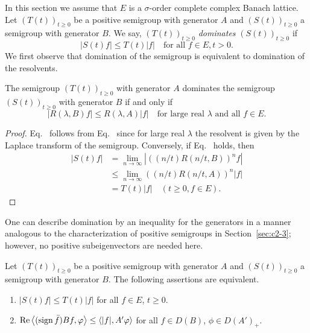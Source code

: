 In this section we assume that $E$ is a $\sigma$-order complete complex Banach lattice. 
Let $(T(t))_{t \geq 0}$ be a positive semigroup with generator $A$ and $(S(t))_{t \geq 0}$ a semigroup with generator $B$. 
We say, $(T(t))_{t \geq 0}$ \emph{dominates} $(S(t))_{t \geq 0}$ if
\begin{equation}\label{eq:c2-4.1}
|S(t)f| \leq T(t)|f| \quad \text{for all } f \in E, t > 0.
\end{equation}
We first observe that domination of the semigroup is equivalent to domination of the resolvents.
\begin{proposition}\label{prop:c2-4.1}
The semigroup $(T(t))_{t \geq 0}$ with generator $A$ dominates the semigroup $(S(t))_{t \geq 0}$ with generator $B$ if and only if
\begin{equation}\label{eq:c2-4.2}
|R(\lambda,B)f| \leq R(\lambda,A)|f| %
\quad \text{for large real }  \lambda  \text{ and all } f \in E .
\end{equation}
\end{proposition}
\begin{proof}
Eq.~ follows from Eq.~ since for large real $\lambda$ the resolvent is given by the Laplace transform of the semigroup. 
Conversely, if Eq.~ holds, then
\begin{align*}
|S(t)f| &= \lim_{n \to \infty} |((n/t)R(n/t,B))^{n}f|\\
&\leq \lim_{n \to \infty} ((n/t)R(n/t,A))^{n}|f|\\
&= T(t)|f| \quad (t \geq 0, f \in E).
\tag*{\qedsymbol}%
\end{align*}
\let\qedsymbol\relax
\end{proof}
One can describe domination by an inequality for the generators in a manner analogous to the characterization of positive semigroups in Section~\ref{sec:c2-3}; however, no positive subeigenvectors are needed here.
\begin{theorem}\label{thm:c2-4.2}
Let $(T(t))_{t \geq 0}$ be a positive semigroup with generator $A$ and $(S(t))_{t \geq 0}$ a semigroup with generator $B$. The following assertions are equivalent.
\begin{enumerate}[\upshape (a)]
\item \label{thm:c2-4.2-1}
$|S(t)f| \leq T(t)|f|$ for all $f \in E$, $t \geq 0$.
\item \label{thm:c2-4.2-2}
$\Re\left\langle(\sign  \bar{f}) Bf,\phi\right\rangle \leq \langle|f|,A'\phi\rangle$ for all $f \in D(B)$, $\phi \in D(A')_{+}$.
\end{enumerate}
\end{theorem}
